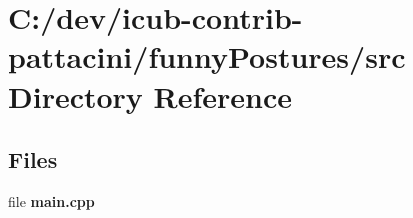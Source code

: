 \section{C\+:/dev/icub-\/contrib-\/pattacini/funny\+Postures/src Directory Reference}
\label{dir_3fc0bfd5dd5d4b135f0761eacfe8c49b}
\subsection*{Files}
\begin{DoxyCompactItemize}
\item 
file {\bfseries main.\+cpp}
\end{DoxyCompactItemize}
